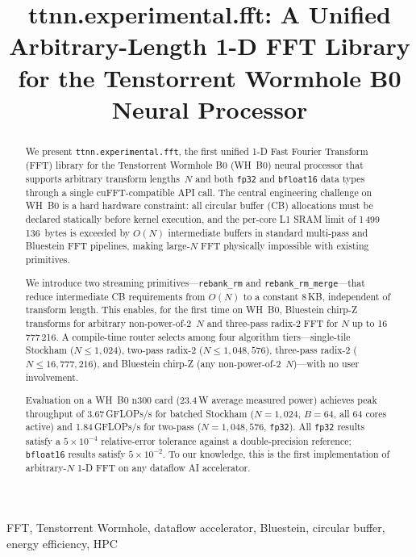 \documentclass[conference]{IEEEtran}
\title{ttnn.experimental.fft: A Unified Arbitrary-Length 1-D FFT Library
       for the Tenstorrent Wormhole B0 Neural Processor}
\author{
  \IEEEauthorblockN{Pratham Korhale}
  \IEEEauthorblockA{
    \textit{Tenstorrent Inc.}\\
    [city, country]\\
    [email]
  }
}
\begin{document}
\maketitle

\begin{abstract}
We present \texttt{ttnn.experimental.fft}, the first unified 1-D Fast Fourier
Transform (FFT) library for the Tenstorrent Wormhole B0 (WH~B0) neural
processor that supports arbitrary transform lengths~$N$ and both \texttt{fp32}
and \texttt{bfloat16} data types through a single cuFFT-compatible API call.
The central engineering challenge on WH~B0 is a hard hardware constraint: all
circular buffer (CB) allocations must be declared statically before kernel
execution, and the per-core L1 SRAM limit of 1\,499\,136~bytes is exceeded by
$O(N)$ intermediate buffers in standard multi-pass and Bluestein FFT pipelines,
making large-$N$ FFT physically impossible with existing primitives.

We introduce two streaming primitives---\texttt{rebank\_rm} and
\texttt{rebank\_rm\_merge}---that reduce intermediate CB requirements from
$O(N)$ to a constant 8\,KB, independent of transform length. This enables, for
the first time on WH~B0, Bluestein chirp-Z transforms for arbitrary
non-power-of-2~$N$ and three-pass radix-2 FFT for $N$ up to 16\,777\,216. A
compile-time router selects among four algorithm tiers---single-tile Stockham
($N \leq 1{,}024$), two-pass radix-2 ($N \leq 1{,}048{,}576$), three-pass
radix-2 ($N \leq 16{,}777{,}216$), and Bluestein chirp-Z (any
non-power-of-2~$N$)---with no user involvement.

Evaluation on a WH~B0 n300 card (23.4\,W average measured power) achieves
peak throughput of 3.67\,GFLOPs/s for batched Stockham ($N{=}1{,}024$,
$B{=}64$, all 64 cores active) and 1.84\,GFLOPs/s for two-pass
($N{=}1{,}048{,}576$, \texttt{fp32}). All \texttt{fp32} results satisfy a
$5{\times}10^{-4}$ relative-error tolerance against a double-precision
reference; \texttt{bfloat16} results satisfy $5{\times}10^{-2}$. To our
knowledge, this is the first implementation of arbitrary-$N$ 1-D FFT on any
dataflow AI accelerator.
\end{abstract}

\begin{IEEEkeywords}
FFT, Tenstorrent Wormhole, dataflow accelerator, Bluestein, circular buffer,
energy efficiency, HPC
\end{IEEEkeywords}
\end{document}
